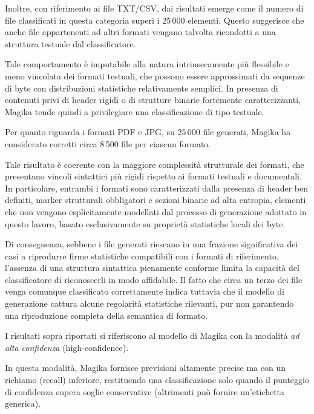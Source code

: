 \documentclass{report}
\begin{document}
\bigskip

Inoltre, con riferimento ai file TXT/CSV, dai risultati emerge come il numero di
file classificati in questa categoria superi i 25\,000 elementi. Questo suggerisce
che anche file appartenenti ad altri formati vengano talvolta ricondotti a una
struttura testuale dal classificatore.

\bigskip

Tale comportamento è imputabile alla natura intrinsecamente più flessibile e meno
vincolata dei formati testuali, che possono essere approssimati da sequenze di
byte con distribuzioni statistiche relativamente semplici. In presenza di contenuti
privi di header rigidi o di strutture binarie fortemente caratterizzanti, Magika
tende quindi a privilegiare una classificazione di tipo testuale.

\bigskip

Per quanto riguarda i formati PDF e JPG, su 25\,000 file generati, Magika ha considerato corretti
circa 8\,500 file per ciascun formato. 

Tale risultato è coerente con la maggiore complessità strutturale dei formati,
che presentano vincoli sintattici più rigidi rispetto ai formati testuali e documentali.
In particolare, entrambi i formati sono caratterizzati dalla presenza di header ben definiti,
marker strutturali obbligatori e sezioni binarie ad alta entropia, elementi che non vengono esplicitamente
modellati dal processo di generazione adottato in questo lavoro, basato esclusivamente su proprietà statistiche locali dei byte.

\bigskip

Di conseguenza, sebbene i file generati riescano in una frazione significativa dei casi a riprodurre firme statistiche compatibili
con i formati di riferimento, l’assenza di una struttura sintattica pienamente conforme limita la capacità del
classificatore di riconoscerli in modo affidabile. Il fatto che circa un terzo dei file venga comunque classificato
correttamente indica tuttavia che il modello di generazione cattura alcune regolarità statistiche rilevanti,
pur non garantendo una riproduzione completa della semantica di formato.

\bigskip

I risultati sopra riportati si riferiscono al modello di Magika con la modalità \emph{ad alta confidenza} (high-confidence).

In questa modalità, Magika fornisce previsioni altamente precise ma con un richiamo (recall) inferiore, 
restituendo una classificazione solo quando il punteggio di confidenza supera soglie conservative 
(altrimenti può fornire un’etichetta generica).
\end{document}
